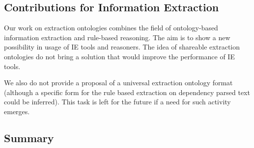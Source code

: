 \subsection{Contributions for Information Extraction}

Our work on extraction ontologies combines the field of ontology-based information extraction and rule-based reasoning. The aim is to show a new possibility in usage of IE tools and reasoners. The idea of shareable extraction ontologies do not bring a solution that would improve the performance of IE tools.

We also do not provide a proposal of a universal extraction ontology format (although a specific form for the rule based extraction on dependency parsed text could be inferred). This task is left for the future if a need for such activity emerges.


\subsection{Summary} \label{sec:onto_conclusion}


   
